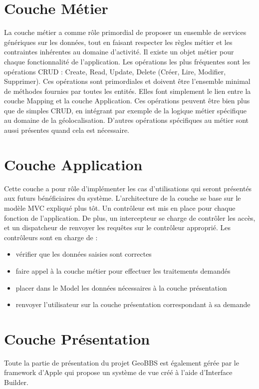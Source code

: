 \documentclass[a4paper,12pt]{report}
\begin{document}
\begin{onehalfspace}
\section{Couche Métier}
  La couche métier a comme rôle primordial de proposer un ensemble de services génériques sur les données, tout en faisant respecter les règles métier et les contraintes inhérentes au domaine d’activité.
  Il existe un objet métier pour chaque fonctionnalité de l’application. Les opérations les plus fréquentes sont les opérations CRUD : Create, Read, Update, Delete (Créer, Lire, Modifier, Supprimer). Ces opérations sont primordiales et doivent être l’ensemble minimal de méthodes fournies par toutes les entités. Elles font simplement le lien entre la couche Mapping et la couche Application.
  Ces opérations peuvent être bien plus que de simples CRUD, en intégrant par exemple de la logique métier spécifique au domaine de la géolocalisation. D’autres opérations spécifiques au métier sont aussi présentes quand cela est nécessaire.

\section{Couche Application}
Cette couche a pour rôle d’implémenter les cas d’utilisations qui seront présentés aux futurs bénéficiaires du système. L’architecture de la couche se base sur le modèle MVC expliqué plus tôt. Un contrôleur est mis en place pour chaque fonction de l’application. De plus, un intercepteur se charge de contrôler les accès, et un dispatcheur de renvoyer les requêtes sur le contrôleur approprié. Les contrôleurs sont en charge de :
\begin{itemize}
  \item vérifier que les données saisies sont correctes
  \item faire appel à la couche métier pour effectuer les traitements demandés
  \item placer dans le Model les données nécessaires à la couche présentation
  \item renvoyer l’utilisateur sur la couche présentation correspondant à sa demande
\end{itemize}

\section{Couche Présentation}
Toute la partie de présentation du projet GeoBBS est également gérée par le framework d'Apple qui propose un système de vue créé à l'aide d'Interface Builder.


\end{onehalfspace}
\end{document}
